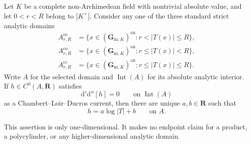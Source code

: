 
\begin{proposition}\label{prop:p062-annulus-endpoint-arbitrary-field}
Let \(K\) be a complete non-Archimedean field with nontrivial absolute
value, and let
\(
             0<r<R
\)
belong to \(|K^\times|\).  Consider any one of the three standard strict
analytic domains
\[
 \begin{aligned}
 A_{r,R}^{\mathrm{oc}}
   &=\{x\in(\mathbf G_{\mathrm m,K})^{\mathrm{an}}:
                                      r<|T(x)|\leq R\},\\
 A_{r,R}^{\mathrm{co}}
   &=\{x\in(\mathbf G_{\mathrm m,K})^{\mathrm{an}}:
                                      r\leq|T(x)|<R\},\\
 A_{r,R}^{\mathrm{cc}}
   &=\{x\in(\mathbf G_{\mathrm m,K})^{\mathrm{an}}:
                                      r\leq|T(x)|\leq R\}.
 \end{aligned}
\]
Write \(A\) for the selected domain and
\(\operatorname{Int}(A)\) for its absolute analytic interior.  If
\(h\in C^0(A,\mathbf R)\) satisfies
\begin{equation}\label{eq:p062-annulus-endpoint-zero-current}
                 \mathrm d'\mathrm d''[h]=0
                 \qquad\text{on }\operatorname{Int}(A)
\end{equation}
as a Chambert--Loir--Ducros current, then there are unique
\(a,b\in\mathbf R\) such that
\begin{equation}\label{eq:p062-annulus-endpoint-affine}
                         h=a\log|T|+b
                         \qquad\text{on }A.
\end{equation}

This assertion is only one-dimensional.  It makes no endpoint claim for a
product, a polycylinder, or any higher-dimensional analytic domain.
\end{proposition}

